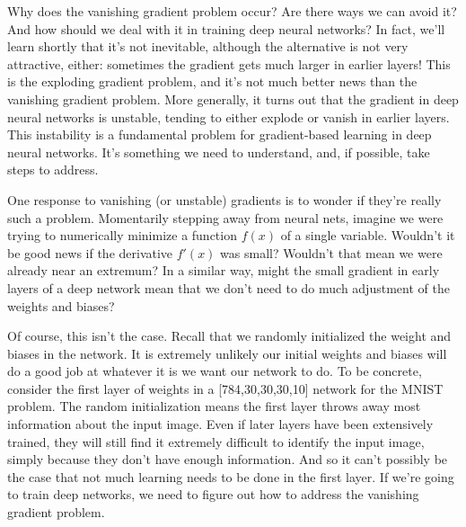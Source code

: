 \documentclass[a4paper,twoside,10pt]{book}
\begin{document}
Why does the vanishing gradient problem occur? Are there ways we can avoid it? And how should we deal with it in training deep neural networks? In fact, we'll learn shortly that it's not inevitable, although the alternative is not very attractive, either: sometimes the gradient gets much larger in earlier layers! This is the exploding gradient problem, and it's not much better news than the vanishing gradient problem. More generally, it turns out that the gradient in deep neural networks is unstable, tending to either explode or vanish in earlier layers. This instability is a fundamental problem for gradient-based learning in deep neural networks. It's something we need to understand, and, if possible, take steps to address.

One response to vanishing (or unstable) gradients is to wonder if they're really such a problem. Momentarily stepping away from neural nets, imagine we were trying to numerically minimize a function $f(x)$ of a single variable. Wouldn't it be good news if the derivative $f'(x)$ was small? Wouldn't that mean we were already near an extremum? In a similar way, might the small gradient in early layers of a deep network mean that we don't need to do much adjustment of the weights and biases?

Of course, this isn't the case. Recall that we randomly initialized the weight and biases in the network. It is extremely unlikely our initial weights and biases will do a good job at whatever it is we want our network to do. To be concrete, consider the first layer of weights in a [784,30,30,30,10] network for the MNIST problem. The random initialization means the first layer throws away most information about the input image. Even if later layers have been extensively trained, they will still find it extremely difficult to identify the input image, simply because they don't have enough information. And so it can't possibly be the case that not much learning needs to be done in the first layer. If we're going to train deep networks, we need to figure out how to address the vanishing gradient problem.
\end{document}
